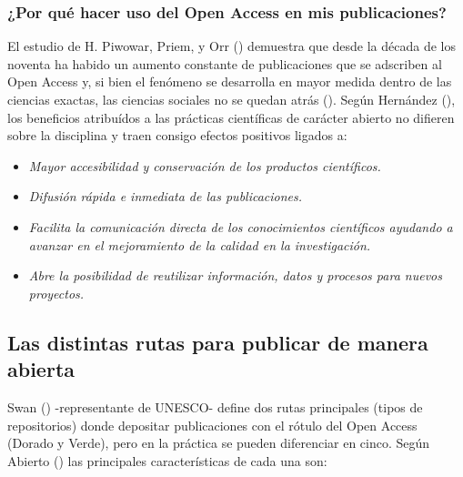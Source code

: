 \documentclass[
  spanish,
  a4paper,
  oneside]{scrbook}
\providecommand{\tightlist}{%
  \setlength{\itemsep}{0pt}\setlength{\parskip}{0pt}}
\begin{document}
\subsubsection*{¿Por qué hacer uso del Open Access en mis
publicaciones?}\label{por-quuxe9-hacer-uso-del-open-access-en-mis-publicaciones}

El estudio de H. Piwowar, Priem, y Orr
() demuestra que desde la década
de los noventa ha habido un aumento constante de publicaciones que se
adscriben al Open Access y, si bien el fenómeno se desarrolla en mayor
medida dentro de las ciencias exactas, las ciencias sociales no se
quedan atrás (). Según
Hernández (), los beneficios
atribuídos a las prácticas científicas de carácter abierto no difieren
sobre la disciplina y traen consigo efectos positivos ligados a:

\begin{itemize}
\tightlist
\item
  \emph{Mayor accesibilidad y conservación de los productos
  científicos.}
\item
  \emph{Difusión rápida e inmediata de las publicaciones.}
\item
  \emph{Facilita la comunicación directa de los conocimientos
  científicos ayudando a avanzar en el mejoramiento de la calidad en la
  investigación.}
\item
  \emph{Abre la posibilidad de reutilizar información, datos y procesos
  para nuevos proyectos.}
\end{itemize}

\subsection{Las distintas rutas para publicar de manera
abierta}\label{las-distintas-rutas-para-publicar-de-manera-abierta}

Swan () -representante de
UNESCO- define dos rutas principales (tipos de repositorios) donde
depositar publicaciones con el rótulo del Open Access (Dorado y Verde),
pero en la práctica se pueden diferenciar en cinco. Según Abierto
() las principales
características de cada una son:
\end{document}
